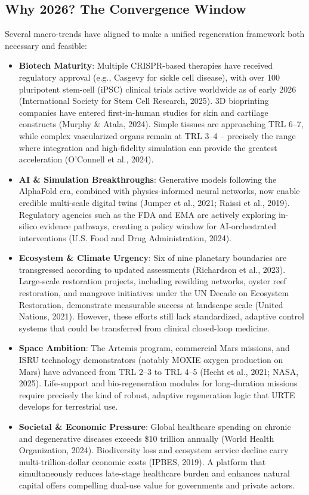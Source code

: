 \documentclass[11pt,a4paper]{article}
\begin{document}
\subsection{Why 2026? The Convergence Window}

Several macro-trends have aligned to make a unified regeneration framework both necessary and feasible:

\begin{itemize}[leftmargin=*,itemsep=0.15em]
    \item \textbf{Biotech Maturity}: Multiple CRISPR-based therapies have received regulatory approval (e.g., Casgevy for sickle cell disease), with over 100 pluripotent stem-cell (iPSC) clinical trials active worldwide as of early 2026 (International Society for Stem Cell Research, 2025). 3D bioprinting companies have entered first-in-human studies for skin and cartilage constructs (Murphy \& Atala, 2024). Simple tissues are approaching TRL 6--7, while complex vascularized organs remain at TRL 3--4 -- precisely the range where integration and high-fidelity simulation can provide the greatest acceleration (O'Connell et al., 2024).

    \item \textbf{AI \& Simulation Breakthroughs}: Generative models following the AlphaFold era, combined with physics-informed neural networks, now enable credible multi-scale digital twins (Jumper et al., 2021; Raissi et al., 2019). Regulatory agencies such as the FDA and EMA are actively exploring in-silico evidence pathways, creating a policy window for AI-orchestrated interventions (U.S. Food and Drug Administration, 2024).

    \item \textbf{Ecosystem \& Climate Urgency}: Six of nine planetary boundaries are transgressed according to updated assessments (Richardson et al., 2023). Large-scale restoration projects, including rewilding networks, oyster reef restoration, and mangrove initiatives under the UN Decade on Ecosystem Restoration, demonstrate measurable success at landscape scale (United Nations, 2021). However, these efforts still lack standardized, adaptive control systems that could be transferred from clinical closed-loop medicine.

    \item \textbf{Space Ambition}: The Artemis program, commercial Mars missions, and ISRU technology demonstrators (notably MOXIE oxygen production on Mars) have advanced from TRL 2--3 to TRL 4--5 (Hecht et al., 2021; NASA, 2025). Life-support and bio-regeneration modules for long-duration missions require precisely the kind of robust, adaptive regeneration logic that URTE develops for terrestrial use.

    \item \textbf{Societal \& Economic Pressure}: Global healthcare spending on chronic and degenerative diseases exceeds \$10 trillion annually (World Health Organization, 2024). Biodiversity loss and ecosystem service decline carry multi-trillion-dollar economic costs (IPBES, 2019). A platform that simultaneously reduces late-stage healthcare burden and enhances natural capital offers compelling dual-use value for governments and private actors.
\end{itemize}
\end{document}
